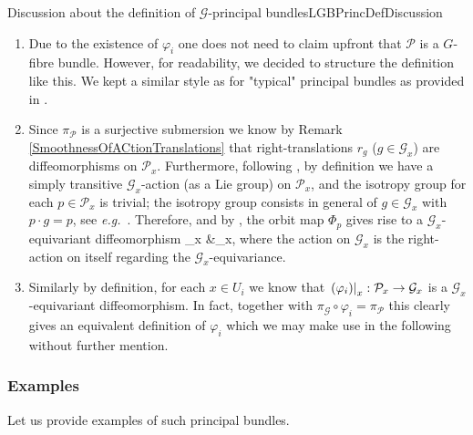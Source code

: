 \documentclass[a4paper,oneside,11pt,bibliography=totoc]{scrartcl}
\def\bas#1\eas{\begin{align*}#1\end{align*}}
\theoremstyle{plain}
\theoremstyle{remark}
\theoremstyle{definition}
\begin{document}
\begin{remarks}{Discussion about the definition of $\mathcal{G}$-principal bundles}{LGBPrincDefDiscussion}
\begin{enumerate}
	We will call such an atlas and its charts a \textbf{principal bundle atlas} and \textbf{principal bundle charts} for $\mathcal{P}$, respectively. For simplicity we may also refer to $\varphi_i$ as principal bundle chart giving rise to the principal bundle atlas.
	\item Due to the existence of $\varphi_i$ one does not need to claim upfront that $\mathcal{P}$ is a $G$-fibre bundle. However, for readability, we decided to structure the definition like this. We kept a similar style as for "typical" principal bundles as provided in \cite[\S 4.2, Def.\ 4.2.1, page 207f.]{Hamilton}.
	\item Since $\pi_{\mathcal{P}}$ is a surjective submersion we know by Remark \ref{SmoothnessOfACtionTranslations} that right-translations $r_g$ ($g \in \mathcal{G}_x$) are diffeomorphisms on $\mathcal{P}_{x}$. Furthermore, following \cite[\S 4.2, discussion after Def.\ 4.2.1, page 208f.]{Hamilton}, by definition we have a simply transitive $\mathcal{G}_x$-action (as a Lie group) on $\mathcal{P}_x$, and the isotropy group for each $p \in \mathcal{P}_x$ is trivial; the isotropy group consists in general of $g \in \mathcal{G}_x$ with $p \cdot g = p$, see \textit{e.g.}\ \cite[\S 3.2, third part of Def.\ 3.2.4, page 132]{Hamilton}. Therefore, and by \cite[\S 3.8, Thm.\ 3.8.8, page 165]{Hamilton}, the orbit map $\Phi_p$ gives rise to a $\mathcal{G}_x$-equivariant diffeomorphism
	\bas
	\mathcal{G}_x &\to {}_x,
	\eas
	where the action on $\mathcal{G}_x$ is the right-action on itself regarding the $\mathcal{G}_x$-equivariance. 
	\item Similarly by definition, for each $x \in U_i$ we know that $\mleft.\mleft(\varphi_i\mright)\mright|_x: \mathcal{P}_x \to \mathcal{G}_x$ is a $\mathcal{G}_x$-equivariant diffeomorphism. In fact, together with $\pi_{\mathcal{G}} \circ \varphi_i = \pi_{\mathcal{P}}$ this clearly gives an equivalent definition of $\varphi_i$ which we may make use in the following without further mention.
\end{enumerate}
\end{remarks}

\subsubsection{Examples}

Let us provide examples of such principal bundles.
\end{document}

